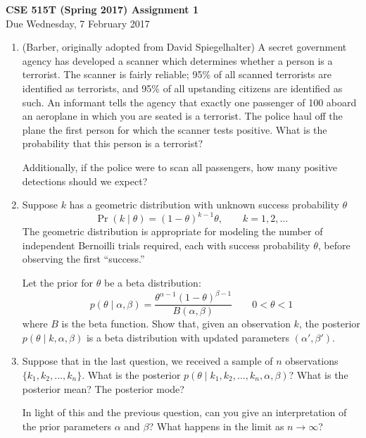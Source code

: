 \documentclass{article}
\newcommand{\given}{\mid}
\begin{document}
{\large \textbf{CSE 515T (Spring 2017) Assignment 1}} \\
Due Wednesday, 7 February 2017 \\

\begin{enumerate}

\item
  (Barber, originally adopted from David Spiegelhalter)
  A secret government agency has developed a scanner which determines
  whether a person is a terrorist. The scanner is fairly reliable;
  95\% of all scanned terrorists are identified as terrorists, and
  95\% of all upstanding citizens are identified as such. An informant
  tells the agency that exactly one passenger of 100 aboard an
  aeroplane in which you are seated is a terrorist. The police haul
  off the plane the first person for which the scanner tests
  positive. What is the probability that this person is a terrorist?

  Additionally, if the police were to scan all passengers, how many
  positive detections should we expect?

\item
  Suppose $k$ has a geometric distribution with unknown success
  probability $\theta$
  \begin{equation*}
    \Pr(k \given \theta) = (1 - \theta)^{k - 1} \theta,
    \qquad
    k = 1, 2, \dotsc
  \end{equation*}
  The geometric distribution is appropriate for modeling the number of
  independent Bernoilli trials required, each with success probability
  $\theta$, before observing the first ``success.''

  Let the prior for $\theta$ be a beta distribution:
  \begin{equation*}
    p(\theta \given \alpha, \beta)
    =
    \frac{\theta^{\alpha - 1} (1 - \theta)^{\beta - 1}}
         {B(\alpha, \beta)}
    \qquad 0 < \theta < 1
  \end{equation*}
  where $B$ is the beta function.  Show that, given an observation
  $k$, the posterior $p(\theta \given k, \alpha, \beta)$ is a beta
  distribution with updated parameters $(\alpha', \beta')$.

\item
  Suppose that in the last question, we received a sample of $n$
  observations $\{k_1, k_2, \dotsc, k_n\}$. What is the posterior
  $p(\theta \given k_1, k_2, \dotsc, k_n, \alpha, \beta)$? What is the
  posterior mean? The posterior mode?

  In light of this and the previous question, can you give an
  interpretation of the prior parameters $\alpha$ and $\beta$?
  What happens in the limit as $n \to \infty$?


\end{enumerate}
\end{document}
